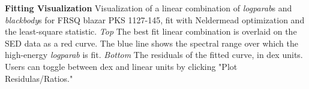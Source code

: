 \textbf{\label{fig:fitting} Fitting Visualization} Visualization of a linear combination of {\it{logparab}}s and {\it{blackbody}}s for FRSQ blazar PKS 1127-145, fit with Neldermead optimization and the least-square statistic. {\it{Top}} The best fit linear combination is overlaid on the SED data as a red curve. The blue line shows the spectral range over which the high-energy {\it{logparab}} is fit. {\it{Bottom}} The residuals of the fitted curve, in dex units. Users can toggle between dex and linear units by clicking "Plot Residulas/Ratios."